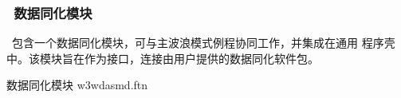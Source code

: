 \vsssub
\subsubsection{~数据同化模块} \label{sec:data_ass}
\vsssub

\ww\ 包含一个数据同化模块，可与主波浪模式例程协同工作，并集成在通用
程序壳中。该模块旨在作为接口，连接由用户提供的数据同化软件包。

\vspace{\baselineskip} \noindent
数据同化模块 \hfill {\file w3wdasmd.ftn}

\begin{flisti}
\end{flisti}
